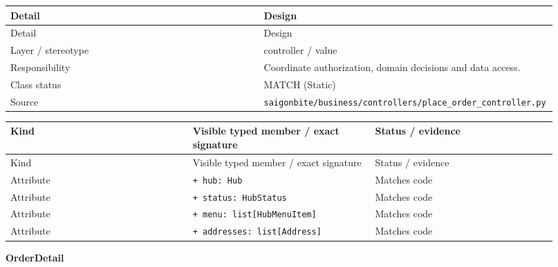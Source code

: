 \begin{longtable}{>{\raggedright\arraybackslash}p{0.4600\linewidth}>{\raggedright\arraybackslash}p{0.4600\linewidth}}
Detail & Design \\
\hline\endfirsthead
Detail & Design \\
\hline\endhead
Layer / stereotype & controller / \guillemotleft{}value\guillemotright{} \\
Responsibility & Coordinate authorization, domain decisions and data access. \\
Class status & MATCH (Static) \\
Source & \texttt{saigonbite/\allowbreak{}business/\allowbreak{}controllers/\allowbreak{}place\_\allowbreak{}order\_\allowbreak{}controller.\allowbreak{}py} \\
\end{longtable}
\begin{longtable}{>{\raggedright\arraybackslash}p{0.3067\linewidth}>{\raggedright\arraybackslash}p{0.3067\linewidth}>{\raggedright\arraybackslash}p{0.3067\linewidth}}
Kind & Visible typed member / exact signature & Status / evidence \\
\hline\endfirsthead
Kind & Visible typed member / exact signature & Status / evidence \\
\hline\endhead
Attribute & \texttt{+ hub: Hub} & Matches code \\
Attribute & \texttt{+ status: HubStatus} & Matches code \\
Attribute & \texttt{+ menu: list[HubMenuItem]} & Matches code \\
Attribute & \texttt{+ addresses: list[Address]} & Matches code \\
\end{longtable}
\textbf{OrderDetail}

